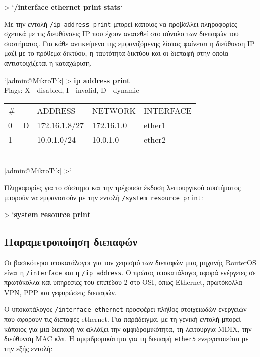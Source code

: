 \documentclass{EdipyLabs} %
\begin{document}
\begin{CommandBox}
 > `\textbf{/interface ethernet print stats}`
\end{CommandBox}

Με την εντολή \texttt{/ip address print} μπορεί κάποιος να προβάλλει πληροφορίες σχετικά με τις διευθύνσεις IP που έχουν ανατεθεί στο σύνολο των διεπαφών του συστήματος. Για κάθε αντικείμενο της εμφανιζόμενης λίστας φαίνεται η διεύθυνση IP μαζί με το πρόθεμα δικτύου, η ταυτότητα δικτύου και οι διεπαφή στην οποία αντιστοιχίζεται η καταχώριση.

\begin{CommandBox}
`{[admin@MikroTik]} > \textbf{ip address print}\\                                   
	Flags: X - disabled, I - invalid, D - dynamic\\
	\begin{tabular}{@{}llm{4.25cm}m{3.65cm}l}
		\#& &  ADDRESS&            NETWORK&         INTERFACE\\                               
		0& D& 172.16.1.8/27&      172.16.1.0&      ether1\\                               
		1&  & 10.0.1.0/24&        10.0.1.0&        ether2  
	\end{tabular}\\                               
	{[admin@MikroTik]} >`
\end{CommandBox}

Πληροφορίες για το σύστημα και την τρέχουσα έκδοση λειτουργικού συστήματος μπορούν να εμφανιστούν με την εντολή \texttt{/system resource print}:

\begin{CommandBox}
 > `\textbf{system resource print}
\end{CommandBox}

\subsection{Παραμετροποίηση διεπαφών}
Οι βασικότεροι υποκατάλογοι για τον χειρισμό των διεπαφών μιας μηχανής RouterOS είναι η \texttt{/interface} και η \texttt{/ip address}. Ο πρώτος υποκατάλογος αφορά ενέργειες σε πρωτόκολλα και υπηρεσίες του επιπέδου 2 στο OSI, όπως Ethernet, πρωτόκολλα VPN, PPP και γεφυρώσεις διεπαφών.

Ο υποκατάλογος \texttt{/interface ethernet} προσφέρει πλήθος στοιχειωδών ενεργειών που αφορούν τις διεπαφές ethernet. Για παράδειγμα, με τη γενική εντολή  μπορεί κάποιος για μια διεπαφή να αλλάξει την αμφιδρομικότητα, τη λειτουργία MDIX, την διεύθυνση MAC κλπ. Η αμφιδρομικότητα για τη διεπαφή \texttt{ether5} ενεργοποιείται με την εξής εντολή:
\end{document}
